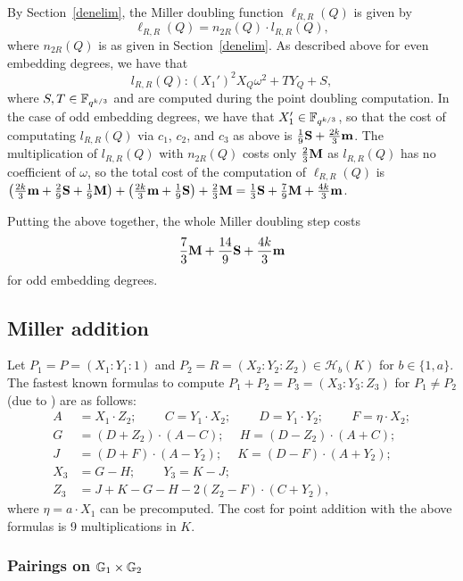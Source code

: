 By Section~\ref{denelim}, the Miller doubling function $\ell_{R,R}(Q)$ is given by
\[\ell_{R,R}(Q) = n_{2R}(Q) \cdot l_{R,R}(Q),\]
where $n_{2R}(Q)$ is as given in Section~\ref{denelim}.
As described above for even embedding degrees, we have that
\[l_{R,R}(Q): (X_1')^2X_Q\omega^2 + T Y_Q + S,\]
where $S,T \in \mathbb{F}_{q^{k/3}}$ and are computed during the point doubling computation. 
In the case of odd embedding degrees, we have that $X_1' \in \mathbb{F}_{q^{k/3}}$,
so that the cost of computating $l_{R,R}(Q)$ via $c_1$, $c_2$, and $c_3$ as above is
$\frac{1}{9}\textbf{S} + \frac{2k}{3}\textbf{m}$.
The multiplication of $l_{R,R}(Q)$ with $n_{2R}(Q)$ costs only $\frac{2}{3}\textbf{M}$ as $l_{R,R}(Q)$ has no coefficient of $\omega$, so the total cost of the computation of $\ell_{R,R}(Q)$ is 
$\left(\frac{2k}{3}\textbf{m} + \frac{2}{9}\textbf{S} + \frac{1}{9}\textbf{M}\right)
+ \left(\frac{2k}{3}\textbf{m} + \frac{1}{9}\textbf{S} \right)
+ \frac{2}{3}\textbf{M}
=
\frac{1}{3}\textbf{S} + \frac{7}{9}\textbf{M} + \frac{4k}{3}\textbf{m}$.

Putting the above together, the whole Miller doubling step costs
\[\frac{7}{3}\textbf{M} + \frac{14}{9}\textbf{S} + \frac{4k}{3}\textbf{m}\]
for odd embedding degrees.

\subsection{Miller addition}

Let $P_1 = P = (X_1:Y_1:1)$ and $P_2 = R = (X_2:Y_2:Z_2) \in \mathcal{H}_b(K)$ for $b \in \{1,a\}$.
The fastest known formulas to compute $P_1 + P_2 = P_3 = (X_3:Y_3:Z_3)$
for $P_1 \neq P_2$ (due to \cite{2012/hess}) are as follows:
\begin{align*}
A &= X_1 \cdot Z_2;\	\qquad
C = Y_1 \cdot X_2;\	\qquad
D = Y_1 \cdot Y_2;\	\qquad
F = \eta \cdot X_2;\\
G &= (D + Z_2) \cdot (A - C);\	\quad
H = (D - Z_2) \cdot (A + C);\\
J &= (D + F) \cdot (A - Y_2);\	\quad
K = (D - F) \cdot (A + Y_2);\\
X_3 &= G - H;\	\qquad
Y_3 = K - J;\\
Z_3 &= J + K - G - H - 2(Z_2 - F) \cdot (C + Y_2),
\end{align*}
where $\eta = a\cdot X_1$ can be precomputed.
The cost for point addition with the above formulas is 9 multiplications in $K$.

\subsubsection{Pairings on $\mathbb{G}_{1} \times \mathbb{G}_{2}$}


